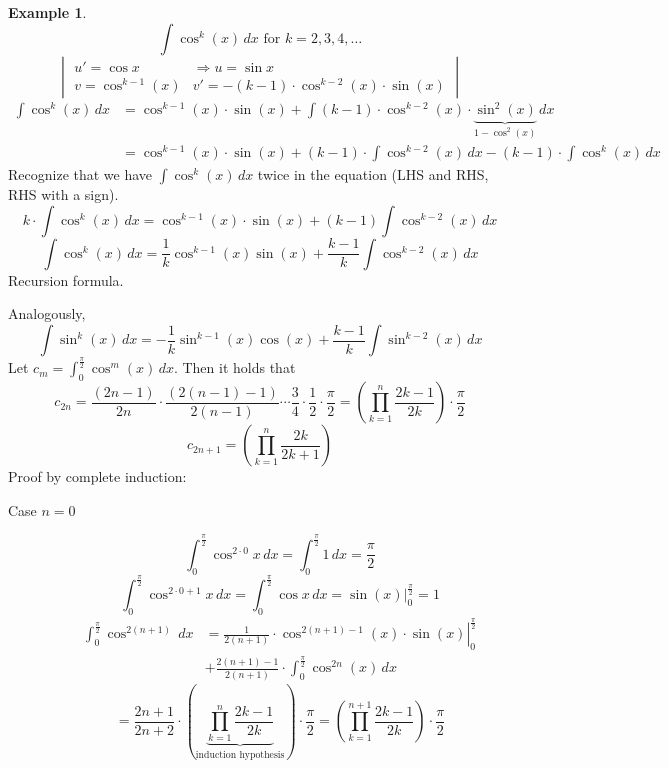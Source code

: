 \documentclass[a4paper,landscape,twocolumn]{article}
\theoremstyle{definition}
\newtheorem{ex}{Example}
\begin{document}
\begin{ex}
  \[ \int \cos^k(x) \, dx \text{ for } k = 2,3,4,\ldots \]
  \[
    \begin{vmatrix}
      u' = \cos{x} & \Rightarrow u = \sin{x} \\
      v = \cos^{k-1}(x) & v' = - (k-1) \cdot \cos^{k-2}(x) \cdot \sin(x)
    \end{vmatrix}
  \] \begin{align*}
    \int \cos^k(x) \, dx
      &= \cos^{k-1}(x) \cdot \sin(x) + \int (k-1) \cdot \cos^{k-2}(x) \cdot \underbrace{\sin^2(x)}_{1 - \cos^2(x)} \, dx \\
      &= \cos^{k-1}(x) \cdot \sin(x) + (k-1) \cdot \int \cos^{k-2}(x) \, dx - (k-1) \cdot \int \cos^k(x) \, dx
  \end{align*}
  Recognize that we have $\int \cos^k(x) \, dx$ twice in the equation (LHS and RHS, RHS with a sign).
  \[
    k \cdot \int \cos^k(x) \, dx
      = \cos^{k-1}(x) \cdot \sin(x) + (k-1) \int \cos^{k-2}(x) \, dx
  \] \[
    \int \cos^k(x) \, dx = \frac1k \cos^{k-1}(x) \sin(x) + \frac{k-1}{k} \int \cos^{k-2}(x) \, dx
  \]
  Recursion formula.

  Analogously,
  \[ \int \sin^k(x) \, dx = -\frac1k \sin^{k-1}(x) \cos(x) + \frac{k-1}{k} \int \sin^{k-2}(x) \, dx \]
  Let $c_m = \int_0^{\frac\pi2} \cos^m(x) \, dx$. Then it holds that
  \[
    c_{2n} = \frac{(2n - 1)}{2n} \cdot \frac{(2(n-1) - 1)}{2(n-1)} \cdots \frac34 \cdot \frac12 \cdot \frac\pi2
      = \left(\prod_{k=1}^n \frac{2k - 1}{2k}\right) \cdot \frac\pi2
  \] \[
    c_{2n + 1} = \left(
      \prod_{k=1}^n \frac{2k}{2k+1}
    \right)
  \]
  Proof by complete induction:
  \begin{description}
    \item[Case $n=0$]
      \[ \int_0^{\frac\pi2} \cos^{2\cdot 0} x \, dx = \int_0^{\frac\pi2} 1 \, dx = \frac\pi2 \]
      \[ \int_0^{\frac\pi2} \cos^{2\cdot 0 + 1} x \, dx = \int_0^{\frac\pi2} \cos{x} \, dx = \sin(x)|_0^{\frac\pi2} = 1 \]
      \begin{align*}
        \int_0^{\frac\pi2} \cos^{2(n+1)} \, dx
          &= \left.\frac{1}{2(n+1)} \cdot \cos^{2(n+1)-1}(x) \cdot \sin(x) \right|_0^{\frac\pi2} \\
          &+ \frac{2(n+1) - 1}{2(n+1)} \cdot \int_0^{\frac\pi2} \cos^{2n}(x) \, dx
      \end{align*} \[
        = \frac{2n+1}{2n+2} \cdot \left(\underbrace{\prod_{k=1}^n \frac{2k-1}{2k}}_{\text{induction hypothesis}}\right) \cdot \frac\pi2
        = \left(\prod_{k=1}^{n+1} \frac{2k-1}{2k}\right) \cdot \frac\pi2
      \]
  \end{description}
\end{ex}
\end{document}
